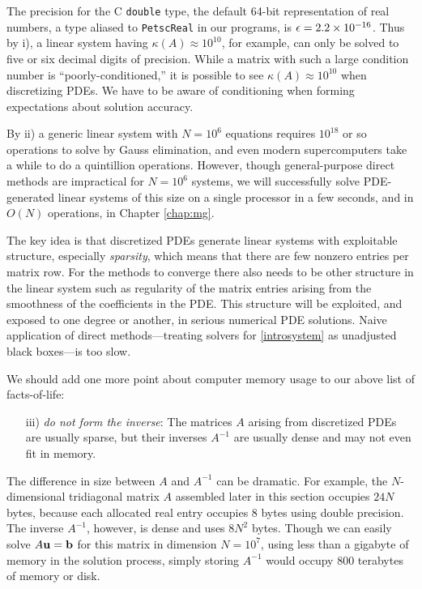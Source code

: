 The precision for the C \texttt{double} type, the default 64-bit representation of real numbers, a type aliased to \texttt{PetscReal} in our \PETSc programs, is $\epsilon = 2.2 \times 10^{-16}$.  Thus by i), a linear system having $\kappa(A) \approx 10^{10}$, for example, can only be solved to five or six decimal digits of precision.  While a matrix with such a large condition number is ``poorly-conditioned,'' it is possible to see $\kappa(A)\approx 10^{10}$ when discretizing PDEs.  We have to be aware of conditioning when forming expectations about solution accuracy.

By ii) a generic linear system with $N=10^6$ equations requires $10^{18}$ or so operations to solve by Gauss elimination, and even modern supercomputers take a while to do a quintillion operations.  However, though general-purpose direct methods are impractical for $N=10^6$ systems, we will successfully solve PDE-generated linear systems of this size on a single processor in a few seconds, and in $O(N)$ operations, in Chapter \ref{chap:mg}.

The key idea is that discretized PDEs generate linear systems with exploitable structure, especially \emph{sparsity}, which means that there are few nonzero entries per matrix row.  For the methods to converge there also needs to be other structure in the linear system such as regularity of the matrix entries arising from the smoothness of the coefficients in the PDE.  This structure will be exploited, and exposed to one degree or another, in serious numerical PDE solutions.  Naive application of direct methods---treating solvers for \eqref{introsystem} as unadjusted black boxes---is too slow.

We should add one more point about computer memory usage to our above list of facts-of-life:
\begin{enumerate}
\item[iii)] \emph{do not form the inverse}:  The matrices $A$ arising from discretized PDEs are usually sparse, but their inverses $A^{-1}$ are usually dense and may not even fit in memory.
\end{enumerate}
The difference in size between $A$ and $A^{-1}$ can be dramatic.  For example, the $N$-dimensional tridiagonal matrix $A$ assembled later in this section occupies $24 N$ bytes, because each allocated real entry occupies 8 bytes using double precision.  The inverse $A^{-1}$, however, is dense and uses $8 N^2$ bytes.  Though we can easily solve $A\mathbf{u}=\mathbf{b}$ for this matrix in dimension $N=10^7$, using less than a gigabyte of memory in the solution process, simply storing $A^{-1}$ would occupy $800$ terabytes of memory or disk.
\vfill


